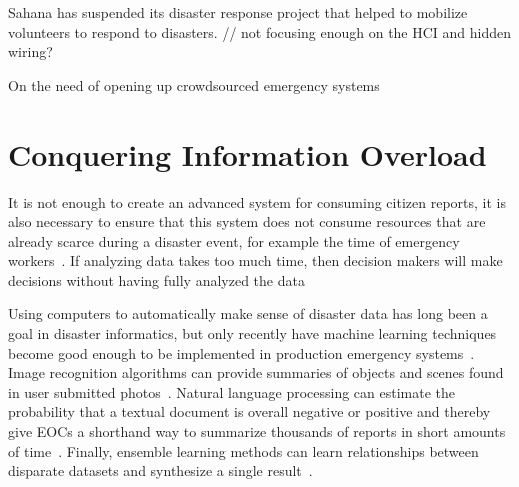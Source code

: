 	Sahana has suspended its disaster response project that helped to
	mobilize volunteers to respond to disasters.
	// not focusing enough on the HCI and hidden wiring?
	
	On the need of opening up crowdsourced emergency systems~\cite{avvenutiNeedOpeningCrowdsourced2018a}

\section{Conquering Information Overload}
	It is not enough to create an advanced system for consuming citizen
	reports, it is also necessary to ensure that this system does not
	consume resources that are already scarce during a disaster event, for
	example the time of emergency
	workers~\cite{aminDataNaturalDisasters2008}. If analyzing data takes too
	much time, then decision makers will make decisions without having fully
	analyzed the data~\cite{quarantelliUrbanVulnerabilityDisasters2003}

	Using computers to automatically make sense of disaster data has long
	been a goal in disaster informatics, but only recently have machine
	learning techniques become good enough to be implemented in production
	emergency systems~\cite{meierDigitalHumanitariansHow2015}. Image
	recognition algorithms can provide summaries of objects and scenes found
	in user submitted photos~\cite{nguyenRapidClassificationCrisisRelated,
	donahueDeCAFDeepConvolutional2013}. Natural language processing can
	estimate the probability that a textual document is overall negative or positive
	and thereby give EOCs a shorthand way to summarize thousands of reports
	in short amounts of time~\cite{nguyenRapidClassificationCrisisRelated,
	nagyCrowdSentimentDetection2012}. Finally, ensemble learning methods can
	learn relationships between disparate datasets and synthesize a single
	result~\cite{mouzannarDamageIdentificationSocial2018}.

